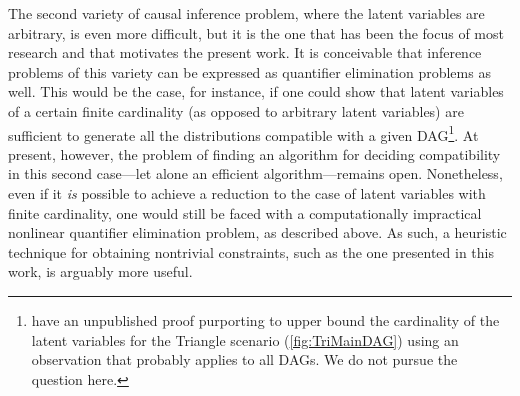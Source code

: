 The second variety of causal inference problem, where the latent variables are arbitrary, is even more difficult, but it is the one that has been the focus of most research and that motivates the present work. It is conceivable that inference problems of this variety can be expressed as quantifier elimination problems as well. This would be the case, for instance, if one could show that latent variables of a certain finite cardinality (as opposed to arbitrary latent variables) are sufficient to generate all the distributions compatible with a given DAG\footnote{\citet{rosset2016finite} have an unpublished proof purporting to upper bound the cardinality of the latent variables for the Triangle scenario (\cref{fig:TriMainDAG}) using an observation that probably applies to all DAGs. We do not pursue the question here.}. At present, however, the problem of finding an algorithm for deciding compatibility in this second case---let alone an efficient algorithm---remains open.  Nonetheless, even if it {\em is} possible to achieve a reduction to the case of latent variables with finite cardinality, one would still be faced with a computationally impractical nonlinear quantifier elimination problem, as described above. As such, a heuristic technique for obtaining nontrivial constraints, such as the one presented in this work, is arguably more useful.  

